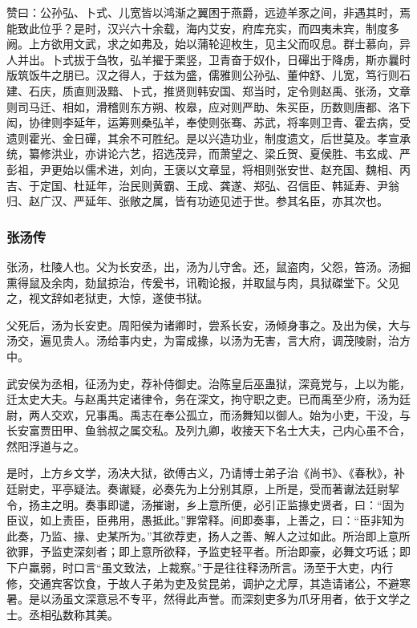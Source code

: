 \documentclass[]{article}
\begin{document}
赞曰：公孙弘、卜式、儿宽皆以鸿渐之翼困于燕爵，远迹羊豕之间，非遇其时，焉能致此位乎？是时，汉兴六十余载，海内艾安，府库充实，而四夷未宾，制度多阙。上方欲用文武，求之如弗及，始以蒲轮迎枚生，见主父而叹息。群士慕向，异人并出。卜式拔于刍牧，弘羊擢于栗竖，卫青奋于奴仆，日磾出于降虏，斯亦曩时版筑饭牛之朋已。汉之得人，于兹为盛，儒雅则公孙弘、董仲舒、儿宽，笃行则石建、石庆，质直则汲黯、卜式，推贤则韩安国、郑当时，定令则赵禹、张汤，文章则司马迁、相如，滑稽则东方朔、枚皋，应对则严助、朱买臣，历数则唐都、洛下闳，协律则李延年，运筹则桑弘羊，奉使则张骞、苏武，将率则卫青、霍去病，受遗则霍光、金日磾，其余不可胜纪。是以兴造功业，制度遗文，后世莫及。孝宣承统，纂修洪业，亦讲论六艺，招选茂异，而萧望之、梁丘贺、夏侯胜、韦玄成、严彭祖，尹更始以儒术进，刘向，王褒以文章显，将相则张安世、赵充国、魏相、丙吉、于定国、杜延年，治民则黄霸、王成、龚遂、郑弘、召信臣、韩延寿、尹翁归、赵广汉、严延年、张敞之属，皆有功迹见述于世。参其名臣，亦其次也。

\hypertarget{header-n4653}{%
\subsubsection{张汤传}\label{header-n4653}}

张汤，杜陵人也。父为长安丞，出，汤为儿守舍。还，鼠盗肉，父怨，笞汤。汤掘熏得鼠及余肉，劾鼠掠治，传爰书，讯鞫论报，并取鼠与肉，具狱磔堂下。父见之，视文辞如老狱吏，大惊，遂使书狱。

父死后，汤为长安吏。周阳侯为诸卿时，尝系长安，汤倾身事之。及出为侯，大与汤交，遍见贵人。汤给事内史，为甯成掾，以汤为无害，言大府，调茂陵尉，治方中。

武安侯为丞相，征汤为史，荐补侍御史。治陈皇后巫蛊狱，深竟党与，上以为能，迁太史大夫。与赵禹共定诸律令，务在深文，拘守职之吏。已而禹至少府，汤为廷尉，两人交欢，兄事禹。禹志在奉公孤立，而汤舞知以御人。始为小吏，干没，与长安富贾田甲、鱼翁叔之属交私。及列九卿，收接天下名士大夫，己内心虽不合，然阳浮道与之。

是时，上方乡文学，汤决大狱，欲傅古义，乃请博士弟子治《尚书》、《春秋》，补廷尉史，平亭疑法。奏谳疑，必奏先为上分别其原，上所是，受而著谳法廷尉挈令，扬主之明。奏事即谴，汤摧谢，乡上意所便，必引正监掾史贤者，曰：``固为臣议，如上责臣，臣弗用，愚抵此。''罪常释。间即奏事，上善之，曰：``臣非知为此奏，乃监、掾、史某所为。''其欲荐吏，扬人之善、解人之过如此。所治即上意所欲罪，予监吏深刻者；即上意所欲释，予监吏轻平者。所治即豪，必舞文巧诋；即下户羸弱，时口言``虽文致法，上裁察。''于是往往释汤所言。汤至于大吏，内行修，交通宾客饮食，于故人子弟为吏及贫昆弟，调护之尤厚，其造请诸公，不避寒暑。是以汤虽文深意忌不专平，然得此声誉。而深刻吏多为爪牙用者，依于文学之士。丞相弘数称其美。
\end{document}

